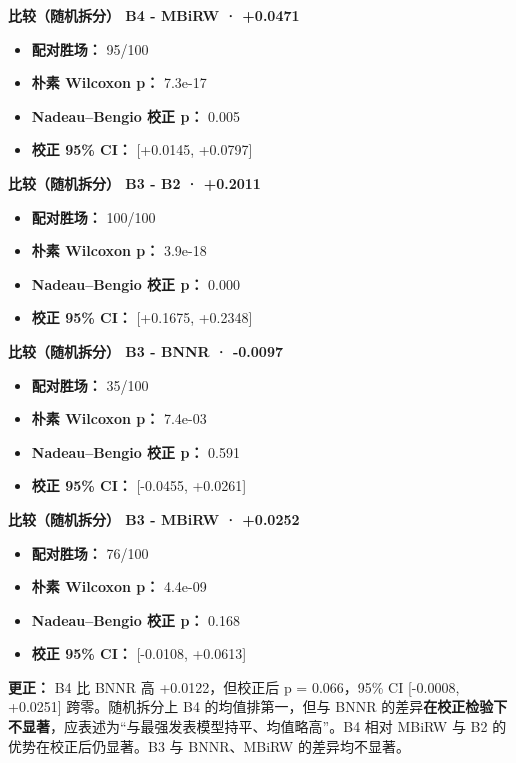 \documentclass[
  10pt,
]{ctexart}
\providecommand{\tightlist}{%
  \setlength{\itemsep}{0pt}\setlength{\parskip}{0pt}}
\begin{document}
\textbf{比较（随机拆分） B4 - MBiRW · +0.0471}

\begin{itemize}
\tightlist
\item
  \textbf{配对胜场：} 95/100
\item
  \textbf{朴素 Wilcoxon p：} 7.3e-17
\item
  \textbf{Nadeau--Bengio 校正 p：} 0.005
\item
  \textbf{校正 95\% CI：} {[}+0.0145, +0.0797{]}
\end{itemize}

\textbf{比较（随机拆分） B3 - B2 · +0.2011}

\begin{itemize}
\tightlist
\item
  \textbf{配对胜场：} 100/100
\item
  \textbf{朴素 Wilcoxon p：} 3.9e-18
\item
  \textbf{Nadeau--Bengio 校正 p：} 0.000
\item
  \textbf{校正 95\% CI：} {[}+0.1675, +0.2348{]}
\end{itemize}

\textbf{比较（随机拆分） B3 - BNNR · -0.0097}

\begin{itemize}
\tightlist
\item
  \textbf{配对胜场：} 35/100
\item
  \textbf{朴素 Wilcoxon p：} 7.4e-03
\item
  \textbf{Nadeau--Bengio 校正 p：} 0.591
\item
  \textbf{校正 95\% CI：} {[}-0.0455, +0.0261{]}
\end{itemize}

\textbf{比较（随机拆分） B3 - MBiRW · +0.0252}

\begin{itemize}
\tightlist
\item
  \textbf{配对胜场：} 76/100
\item
  \textbf{朴素 Wilcoxon p：} 4.4e-09
\item
  \textbf{Nadeau--Bengio 校正 p：} 0.168
\item
  \textbf{校正 95\% CI：} {[}-0.0108, +0.0613{]}
\end{itemize}

\textbf{更正：} B4 比 BNNR 高 +0.0122，但校正后 p = 0.066，95\% CI
{[}-0.0008, +0.0251{]} 跨零。随机拆分上 B4 的均值排第一，但与 BNNR
的差异\textbf{在校正检验下不显著}，应表述为``与最强发表模型持平、均值略高''。B4
相对 MBiRW 与 B2 的优势在校正后仍显著。B3 与 BNNR、MBiRW
的差异均不显著。
\end{document}
